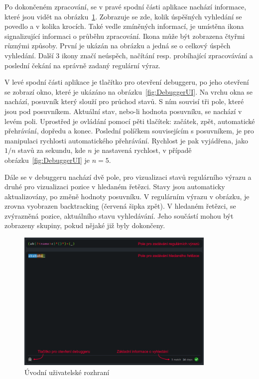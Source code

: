 Po dokončeném zpracování, se v pravé spodní části aplikace nachází informace, které jsou vidět na obrázku~\ref{fig:GeneralUI}.
Zobrazuje se zde, kolik úspěšných vyhledání se povedlo a v kolika krocích.
Také vedle zmíněných informací, je umístěna ikona signalizující informaci o průběhu zpracování.
Ikona může být zobrazena čtyřmi různými způsoby.
První je ukázán na obrázku a jedná se o celkový úspěch vyhledání.
Další 3 ikony značí neúspěch, načítání resp. probíhající zpracovávání a poslední čekání na správně zadaný regulární výraz.

V levé spodní části aplikace je tlačítko pro otevření debuggeru, po jeho otevření se zobrazí okno, které je ukázáno na obrázku~\ref{fig:DebuggerUI}.
Na vrchu okna se nachází, posuvník který slouží pro průchod stavů.
S ním souvisí tři pole, které jsou pod posuvníkem.
Aktuální stav, nebo-li hodnota posuvníku, se nachází v levém poli.
Uprostřed je ovládání pomocí pěti tlačítek: začátek, zpět, automatické přehrávání, dopředu a konec.
Poslední políčkem souvisejícím s posuvníkem, je pro manipulaci rychlosti automatického přehrávání.
Rychlost je pak vyjádřena, jako $1/n$ stavů za sekundu, kde $n$ je nastavená rychlost, v případě obrázku~\ref{fig:DebuggerUI} je $n = 5$.

Dále se v debuggeru nachází dvě pole, pro vizualizaci stavů regulárního výrazu a druhé pro vizualizaci pozice v hledaném řetězci.
Stavy jsou automaticky aktualizovány, po změně hodnoty posuvníku.
V regulárním výrazu v obrázku, je zrovna vyobrazen backtracking (červená šipka zpět).
V hledaném řetězci, se zvýrazněná pozice, aktuálního stavu vyhledávání.
Jeho součástí mohou být zobrazeny skupiny, pokud nějaké již byly dokončeny.

\begin{figure}[!h]
	\centering
	\includegraphics[width=0.85\textwidth]{Figures/appWindow.png}
	\caption{Úvodní uživatelské rozhraní}
	\label{fig:GeneralUI}
\end{figure}

